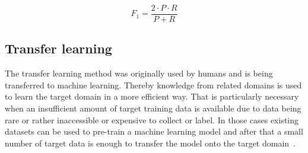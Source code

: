 \begin{equation}
	\label{eq:intro:f1}
	F_1 = \frac{2 \cdot P \cdot R}{P + R}
\end{equation}   

\subsection{Transfer learning}\label{subsec:intro:transferlearning}

The transfer learning method was originally used by humans and is being transferred to machine 
learning. Thereby knowledge from related domains is used to learn the target domain in a more 
efficient way. That is particularly necessary when an insufficient amount of target training data is 
available due to data being rare or rather inaccessible or expensive to collect or label. In those cases 
existing datasets can be used to pre-train a machine learning model and after that a small number of 
target data is enough to transfer the model onto the target domain~\cite{weiss2016}.